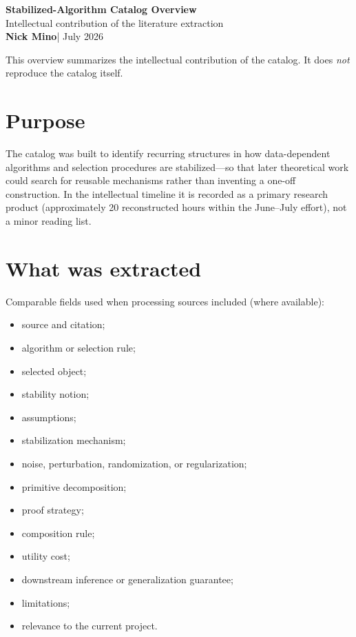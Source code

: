 \documentclass[11pt]{article}
\begin{document}
\begin{center}
{\LARGE\bfseries\color{navy} Stabilized-Algorithm Catalog Overview}\\[3pt]
{\normalsize\color{slate} Intellectual contribution of the literature extraction}\\[2pt]
{\small\textbf{Nick Mino}\quad\textcolor{accent}{|} July 2026}
\end{center}

\vspace{2pt}

\begin{tcolorbox}[notebox]
This overview summarizes the intellectual contribution of the catalog.
It does \emph{not} reproduce the catalog itself.
\end{tcolorbox}

\section{Purpose}

The catalog was built to identify recurring structures in how data-dependent
algorithms and selection procedures are stabilized---so that later theoretical work
could search for reusable mechanisms rather than inventing a one-off construction.
In the intellectual timeline it is recorded as a primary research product
(approximately 20 reconstructed hours within the June--July effort), not a minor
reading list.

\section{What was extracted}

Comparable fields used when processing sources included (where available):

\begin{itemize}
  \item source and citation;
  \item algorithm or selection rule;
  \item selected object;
  \item stability notion;
  \item assumptions;
  \item stabilization mechanism;
  \item noise, perturbation, randomization, or regularization;
  \item primitive decomposition;
  \item proof strategy;
  \item composition rule;
  \item utility cost;
  \item downstream inference or generalization guarantee;
  \item limitations;
  \item relevance to the current project.
\end{itemize}
\end{document}
